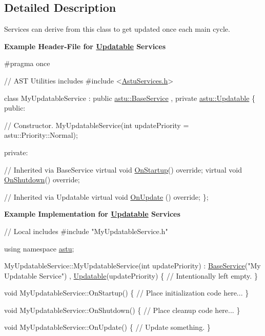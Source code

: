 \subsection{Detailed Description}
Services can derive from this class to get updated once each main cycle.

{\bfseries Example Header-\/\+File for \hyperlink{classastu_1_1Updatable}{Updatable} Services} 
\begin{DoxyCodeInclude}
\textcolor{preprocessor}{#pragma once}

\textcolor{comment}{// AST Utilities includes}
\textcolor{preprocessor}{#include <\hyperlink{AstuServices_8h}{AstuServices.h}>}

\textcolor{keyword}{class }MyUpdatableService 
    : \textcolor{keyword}{public} \hyperlink{classastu_1_1BaseService}{astu::BaseService}
    , \textcolor{keyword}{private} \hyperlink{classastu_1_1Updatable}{astu::Updatable}
\{
\textcolor{keyword}{public}:
    
    \textcolor{comment}{// Constructor.}
    MyUpdatableService(\textcolor{keywordtype}{int} updatePriority = astu::Priority::Normal);

\textcolor{keyword}{private}:

    \textcolor{comment}{// Inherited via BaseService}
    \textcolor{keyword}{virtual} \textcolor{keywordtype}{void} \hyperlink{classastu_1_1Service_a357dc663e000b1f086f681ec3c459bfe}{OnStartup}() \textcolor{keyword}{override};
    \textcolor{keyword}{virtual} \textcolor{keywordtype}{void} \hyperlink{classastu_1_1Service_a1e1dff727df791c57fae782d8a613c5f}{OnShutdown}() \textcolor{keyword}{override};

    \textcolor{comment}{// Inherited via Updatable}
    \textcolor{keyword}{virtual} \textcolor{keywordtype}{void} \hyperlink{classastu_1_1Updatable_a925566c9770b95895c6c7294f9d51528}{OnUpdate} () \textcolor{keyword}{override};
\};
\end{DoxyCodeInclude}


{\bfseries Example Implementation for \hyperlink{classastu_1_1Updatable}{Updatable} Services} 
\begin{DoxyCodeInclude}
\textcolor{comment}{// Local includes}
\textcolor{preprocessor}{#include "MyUpdatableService.h"}

\textcolor{keyword}{using namespace }\hyperlink{namespaceastu}{astu};

MyUpdatableService::MyUpdatableService(\textcolor{keywordtype}{int} updatePriority)
    : \hyperlink{classastu_1_1BaseService}{BaseService}(\textcolor{stringliteral}{"My Updatable Service"})
    , \hyperlink{classastu_1_1Updatable}{Updatable}(updatePriority)
\{
    \textcolor{comment}{// Intentionally left empty.}
\}

\textcolor{keywordtype}{void} MyUpdatableService::OnStartup()
\{
    \textcolor{comment}{// Place initialization code here...}
\}

\textcolor{keywordtype}{void} MyUpdatableService::OnShutdown()
\{
    \textcolor{comment}{// Place cleanup code here...}
\}

\textcolor{keywordtype}{void} MyUpdatableService::OnUpdate()
\{
    \textcolor{comment}{// Update something.}
\}
\end{DoxyCodeInclude}
 

